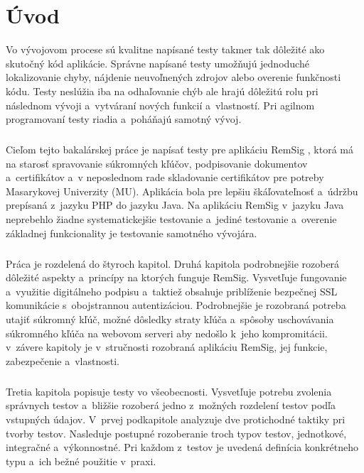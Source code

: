 \documentclass[
  digital, %
  table,   %
oneside,
  nolof,     %
  nolot,     %
]{fithesis3}
\begin{document}
\chapter{Úvod}
Vo vývojovom procese sú kvalitne napísané testy takmer tak dôležité ako skutočný kód aplikácie. Správne napísané testy umožňujú jednoduché lokalizovanie chyby, nájdenie neuvoľnených zdrojov alebo overenie funkčnosti kódu. Testy neslúžia iba na odhaľovanie chýb ale hrajú dôležitú rolu pri následnom vývoji a~vytváraní nových funkcií a~vlastností. Pri agilnom programovaní \cite{agileDef} testy riadia a~poháňajú samotný vývoj. \paragraph{}
Cieľom tejto bakalárskej práce je napísať testy pre aplikáciu RemSig \cite{remsigMuni}, ktorá má na starosť spravovanie súkromných kľúčov, podpisovanie dokumentov a~certifikátov a~v neposlednom rade skladovanie certifikátov pre potreby Masarykovej Univerzity (MU). Aplikácia bola pre lepšiu škáľovateľnosť a~údržbu prepísaná z~jazyku PHP do jazyku Java. Na aplikáciu RemSig  v~jazyku Java neprebehlo žiadne systematickejšie testovanie a~jediné testovanie a~overenie základnej funkcionality je testovanie samotného vývojára.\paragraph{}
Práca je rozdelená do štyroch kapitol. Druhá kapitola podrobnejšie rozoberá dôležité aspekty a~princípy na ktorých funguje RemSig. Vysvetľuje fungovanie a~využitie digitálneho podpisu a~taktiež obsahuje priblíženie bezpečnej SSL komunikácie s~obojstrannou autentizáciou. Podrobnejšie je rozobraná potreba utajiť súkromný kľúč, možné dôsledky straty kľúča a~spôsoby uschovávania súkromného kľúča na webovom serveri aby nedošlo k~jeho kompromitácii. v~závere kapitoly  je v~stručnosti rozobraná aplikáciu RemSig, jej funkcie, zabezpečenie a~vlastnosti. \paragraph{}
Tretia kapitola popisuje testy vo všeobecnosti. Vysvetľuje potrebu zvolenia správnych testov a~bližšie rozoberá jedno z~možných rozdelení testov podľa vstupných údajov. V~prvej podkapitole analyzuje dve protichodné taktiky pri tvorby testov. Nasleduje postupné rozoberanie troch typov testov, jednotkové, integračné a~výkonnostné. Pri každom z~testov je uvedená definícia konkrétneho typu a~ich bežné použitie v~praxi.\paragraph{}
\end{document}
